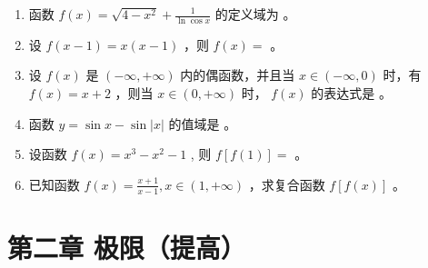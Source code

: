 \documentclass[12pt, a4paper]{article}
\newcommand{\blank}[1]{\underline{\hspace{#1}}}
\begin{document}
\begin{enumerate}
    \item 函数 $ f(x) = \sqrt{4 - x^{2}} + \frac{1}{\ln \cos x} $ 的定义域为 \blank{2cm}。

    \item 设 $ f(x-1)=x(x-1) $ ，则 $ f(x)= $ \blank{2cm}。

    \item 设 $ f(x) $ 是 $ (-\infty, +\infty) $ 内的偶函数，并且当 $ x \in (-\infty, 0) $ 时，有 $ f(x) = x + 2 $ ，则当 $ x \in (0, +\infty) $ 时， $ f(x) $ 的表达式是 \blank{2cm}。

    \item 函数 $ y = \sin x - \sin |x| $ 的值域是 \blank{2cm}。

    \item 设函数 $ f(x)=x^{3}-x^{2}-1 $ , 则 $ f[f(1)]= $ \blank{2cm}。

    \item 已知函数 $ f(x)=\frac{x+1}{x-1},x\in(1,+\infty) $ ，求复合函数 $ f[f(x)] $ 。
\end{enumerate}

\section*{第二章 极限（提高）}
\end{document}
